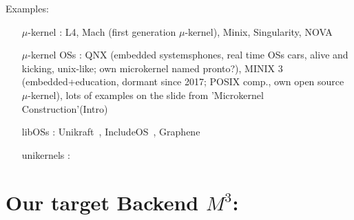 
Examples:
\begin{itemize}
    \item[$\mu$-kernel]: L4, Mach (first generation $\mu$-kernel), Minix, Singularity, NOVA
    \item[$\mu$-kernel OSs]: QNX (embedded systems\means phones, real time OSs \means cars, alive and kicking, unix-like; own microkernel named pronto?), MINIX 3 (embedded+education, dormant since 2017; POSIX comp., own open source $\mu$-kernel), lots of examples on the slide from 'Microkernel Construction'(Intro)
    \item[libOSs]: Unikraft~\cite{kuenzer2021unikraft}, IncludeOS~\cite{bratterud2015includeos}, Graphene~\cite{tsai2014Graphene}
    \item[unikernels]:
\end{itemize}

\section{Our target Backend $M^3$:}
